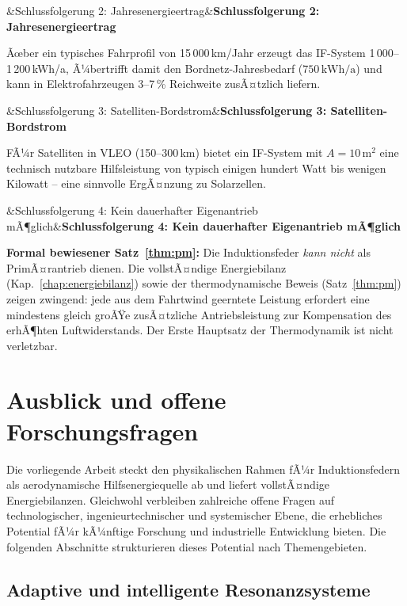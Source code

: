 ﻿\documentclass[12pt, a4paper]{report}
\newenvironment{wichtig}[1][]{%
  \begin{wichtigframe}\sloppy%
  \ifx&#1&\else\textbf{#1}\par\smallskip\fi}{\end{wichtigframe}}
\newenvironment{ergebnis}[1][]{%
  \begin{ergebnisframe}\sloppy%
  \ifx&#1&\else\textbf{#1}\par\smallskip\fi}{\end{ergebnisframe}}
\theoremstyle{definition}
\theoremstyle{remark}
\begin{document}
\begin{ergebnis}[Schlussfolgerung 2: Jahresenergieertrag]
  Ãœber ein typisches Fahrprofil von 15\,000\,km/Jahr erzeugt das IF-System
  1\,000--1\,200\,kWh/a, Ã¼bertrifft damit den Bordnetz-Jahresbedarf
  ($750\,\text{kWh/a}$) und kann in Elektrofahrzeugen 3--7\,\% Reichweite
  zusÃ¤tzlich liefern.
\end{ergebnis}

\begin{ergebnis}[Schlussfolgerung 3: Satelliten-Bordstrom]
  FÃ¼r Satelliten in VLEO (150--300\,km) bietet ein IF-System mit
  $A = 10\,\text{m}^2$ eine technisch nutzbare Hilfsleistung von
  typisch einigen hundert Watt bis wenigen Kilowatt -- eine sinnvolle
  ErgÃ¤nzung zu Solar\-zellen.
\end{ergebnis}

\begin{wichtig}[Schlussfolgerung 4: Kein dauerhafter Eigenantrieb mÃ¶glich]
  \textbf{Formal bewiesener Satz~\ref{thm:pm}:} Die Induktionsfeder \emph{kann nicht}
  als PrimÃ¤rantrieb dienen. Die vollstÃ¤ndige Energiebilanz (Kap.~\ref{chap:energiebilanz})
  sowie der thermodynamische Beweis (Satz~\ref{thm:pm}) zeigen zwingend:
  jede aus dem Fahrtwind geerntete Leistung erfordert eine mindestens gleich
  groÃŸe zusÃ¤tzliche Antriebsleistung zur Kompensation des erhÃ¶hten Luftwiderstands.
  Der Erste Hauptsatz der Thermodynamik ist nicht verletzbar.
\end{wichtig}

\section{Ausblick und offene Forschungsfragen}
\label{sec:ausblick}

Die vorliegende Arbeit steckt den physikalischen Rahmen fÃ¼r Induktionsfedern
als aerodynamische Hilfsenergiequelle ab und liefert vollstÃ¤ndige Energiebilanzen.
Gleichwohl verbleiben zahlreiche offene Fragen auf technologischer, ingenieurtechnischer
und systemischer Ebene, die erhebliches Potential fÃ¼r kÃ¼nftige Forschung und
industrielle Entwicklung bieten. Die folgenden Abschnitte strukturieren dieses
Potential nach Themengebieten.

\subsection{Adaptive und intelligente Resonanzsysteme}
\label{ssec:ausblick_resonanz}
\end{document}
